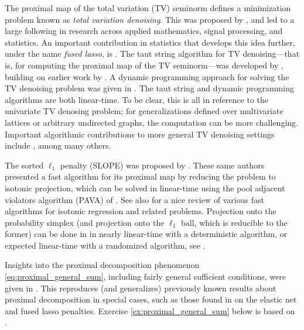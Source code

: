 The proximal map of the total variation (TV) seminorm defines a minimization
problem known as \emph{total variation denoising}. This was proposed by
\cite{rudin1992nonlinear}, and led to a large following in research across
applied mathematics, signal processing, and statistics. An important
contribution in statistics that develops this idea further, under the name
\emph{fused lasso}, is \cite{tibshirani2005sparsity}. The taut string algorithm
for TV denoising---that is, for computing the proximal map of the TV
seminorm---was developed by \cite{davies2001local}, building on earlier work by
\cite{mammen1997locally}. A dynamic programming approach for solving the TV
denoising problem was given in \cite{johnson2013dynamic}. The taut string and
dynamic programming algorithms are both linear-time. To be clear, this is all in
reference to the univariate TV denosing problem; for generalizations defined
over multivariate lattices or arbitrary undirected graphs, the computation can
be more challenging. Important algorithmic contributions to more general TV 
denoising settings include \cite{chambolle2009total, chambolle2011first,
  barbero2018modular}, among many others. 

The sorted $\ell_1$ penalty (SLOPE) was proposed by \cite{bogdan2015slope}. 
These same authors presented a fast algorithm for its proximal map by reducing
the problem to isotonic projection, which can be solved in linear-time using the
pool adjacent violators algorithm (PAVA) of \cite{barlow1972statistical}. See
also \cite{deleeuw2010isotonic} for a nice review of various fast algorithms for
isotonic regression and related problems. Projection onto the probability
simplex (and projection onto the $\ell_1$ ball, which is reducible to the
former) can be done in in nearly linear-time with a deterministic algorithm, or
expected linear-time with a randomized algorithm, see \cite{duchi2008efficient, 
  condat2016fast}.   

Insights into the proximal decomposition phenomenon
\eqref{eq:proximal_general_sum}, including fairly general sufficient conditions,
were given in \cite{yu2013decomposing}. This reproduces (and generalizes)
previously known results about proximal decomposition in special cases, such as 
those found in \cite{friedman2007pathwise} on the elastic net and fused lasso
penalties. Exercise \ref{ex:proximal_general_sum} below is based on
\cite{yu2013decomposing}.    

\clearpage

